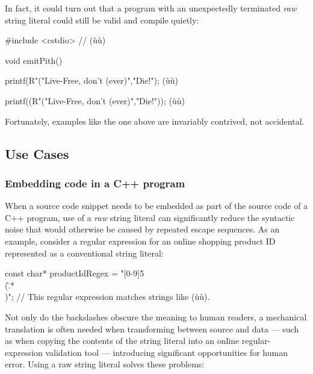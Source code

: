 \noindent In fact, it could turn out that a program with an unexpectedly
terminated \emph{raw} string literal could still be valid and compile
quietly:

\begin{emcppshiddenlisting}[emcppsbatch=e1]
#include <cstdio>   // (ù{}ù)
\end{emcppshiddenlisting}
\begin{emcppslisting}[emcppsbatch=e1]
void emitPith()
{
    printf(R"("Live-Free, don't (ever)","Die!");
        (ù{}ù)

    printf((R"("Live-Free, don't (ever)","Die!"));
        (ù{}ù)
}
\end{emcppslisting}
    
\noindent Fortunately, examples like the one above are invariably contrived, not
accidental.

\subsection[Use Cases]{Use Cases}\label{use-cases}

\subsubsection[Embedding code in a C++ program]{Embedding code in a C++ program}\label{embedding-code-in-a-c++-program}

When a source code snippet needs to be embedded as part of the source
code of a C++ program, use of a \emph{raw} string literal can
significantly reduce the syntactic noise that would otherwise be caused
by repeated escape sequences. As an example, consider a regular
expression for an online shopping product ID represented as a
conventional string literal:

\begin{emcppslisting}
const char* productIdRegex = "[0-9]{5}\\(\".*\"\\)";
    // This regular expression matches strings like (ù{}ù).
\end{emcppslisting}
   
\noindent Not only do the backslashes obscure the meaning to human readers, a
mechanical translation is often needed when transforming between source
and data --- such as when copying the contents of the string literal into an online regular-expression validation tool --- introducing significant opportunities for human error. Using a
raw string literal solves these problems:

